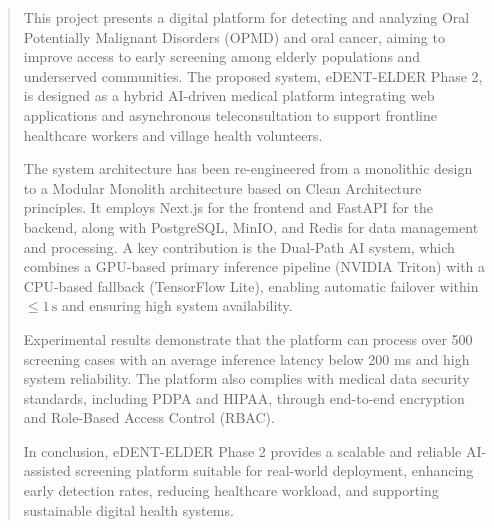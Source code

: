 \begin{abstract}
This project presents a digital platform for detecting and analyzing Oral Potentially Malignant Disorders (OPMD) and oral cancer, aiming to improve access to early screening among elderly populations and underserved communities. The proposed system, eDENT-ELDER Phase 2, is designed as a hybrid AI-driven medical platform integrating web applications and asynchronous teleconsultation to support frontline healthcare workers and village health volunteers.

The system architecture has been re-engineered from a monolithic design to a Modular Monolith architecture based on Clean Architecture principles. It employs Next.js for the frontend and FastAPI for the backend, along with PostgreSQL, MinIO, and Redis for data management and processing. A key contribution is the Dual-Path AI system, which combines a GPU-based primary inference pipeline (NVIDIA Triton) with a CPU-based fallback (TensorFlow Lite), enabling automatic failover within $\leq 1\,\text{s}$ and ensuring high system availability.

Experimental results demonstrate that the platform can process over 500 screening cases with an average inference latency below 200 ms and high system reliability. The platform also complies with medical data security standards, including PDPA and HIPAA, through end-to-end encryption and Role-Based Access Control (RBAC).

In conclusion, eDENT-ELDER Phase 2 provides a scalable and reliable AI-assisted screening platform suitable for real-world deployment, enhancing early detection rates, reducing healthcare workload, and supporting sustainable digital health systems.
\end{abstract}

%


